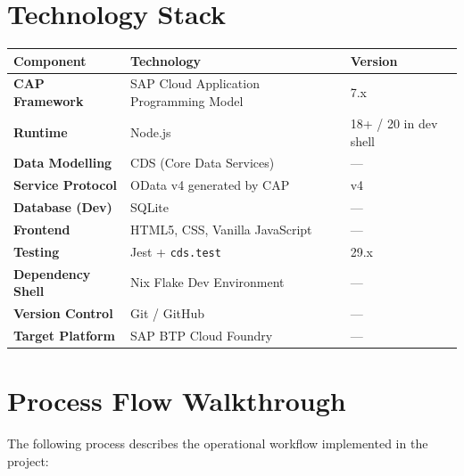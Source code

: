 \documentclass[a4paper,12pt]{article}
\begin{document}
\section{Technology Stack}

\begin{center}
\begin{tabularx}{\linewidth}{>{\bfseries}l >{\raggedright\arraybackslash}X l}
\toprule
Component & Technology & Version \\
\midrule
CAP Framework & SAP Cloud Application Programming Model & 7.x \\
Runtime & Node.js & 18+ / 20 in dev shell \\
Data Modelling & CDS (Core Data Services) & --- \\
Service Protocol & OData v4 generated by CAP & v4 \\
Database (Dev) & SQLite & --- \\
Frontend & HTML5, CSS, Vanilla JavaScript & --- \\
Testing & Jest + \texttt{cds.test} & 29.x \\
Dependency Shell & Nix Flake Dev Environment & --- \\
Version Control & Git / GitHub & --- \\
Target Platform & SAP BTP Cloud Foundry & --- \\
\bottomrule
\end{tabularx}
\end{center}

\section{Process Flow Walkthrough}

The following process describes the operational workflow implemented in the project:
\end{document}
